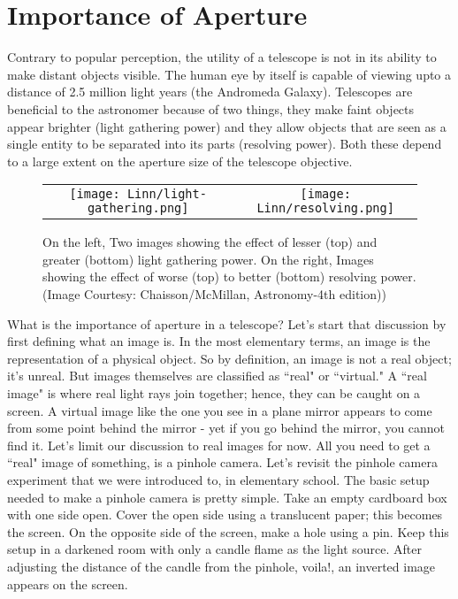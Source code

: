 \documentclass{../template/texnote}
\begin{document}
\section{Importance of Aperture}
Contrary to popular perception, the utility of a telescope is not in its ability to make distant objects visible. The human eye by itself is capable of viewing upto a distance of 2.5 million light years (the Andromeda Galaxy). Telescopes are beneficial to the astronomer because of two things, they make faint objects appear brighter (light gathering power) and they allow objects that are seen as a single entity to be separated into its parts (resolving power).
Both these depend to a large extent on the aperture size of the telescope objective.
\begin{figure}
\begin{tabular}{cc}
  \texttt{[image: Linn/light-gathering.png]} &   \texttt{[image: Linn/resolving.png]} \\
\end{tabular}
\caption{On the left, Two images showing the effect of lesser (top) and greater (bottom) light gathering power.
On the right,
Images showing the effect of worse (top) to better (bottom) resolving power. (Image Courtesy: Chaisson/McMillan, Astronomy-4th edition))
}
\label{fig:pinhole_cam}
\end{figure}

What is the importance of aperture in a telescope?
Let's start that discussion by first defining what an image is. In the most elementary terms, an image is the representation of a physical object. So by definition, an image is not a real object; it's unreal. But images themselves are classified as ``real" or ``virtual."
A ``real image" is where real light rays join together; hence, they can be caught on a screen. A virtual image like the one you see in a plane mirror appears to come from some point behind the mirror - yet if you go behind the mirror, you cannot find it.
Let's limit our discussion to real images for now.
All you need to get a ``real" image of something, is a pinhole camera. Let's revisit the pinhole camera experiment that we were introduced to, in
elementary school. The basic setup needed to make a pinhole camera is pretty simple. Take an empty cardboard box with one side open. Cover the open side using a translucent paper; this becomes the screen. On the opposite side of the screen, make a hole using a pin. Keep this setup in a darkened room with only a candle flame as the light source.  After adjusting the distance of the candle from the pinhole, voila!, an inverted image appears on the screen.
\end{document}
